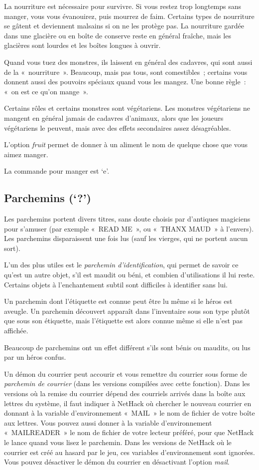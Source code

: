 \documentclass[titlepage]{article}
\begin{document}
La nourriture est nécessaire pour survivre.
Si vous restez trop longtemps sans manger, vous vous évanouirez, puis
mourrez de faim.
Certains types de nourriture se gâtent et deviennent malsains si on ne les
protège pas.
La nourriture gardée dans une glacière ou en boîte de conserve reste en
général fraîche, mais les glacières sont lourdes et les boîtes longues à
ouvrir.


Quand vous tuez des monstres, ils laissent en général des cadavres, qui
sont aussi de la «~nourriture~».
Beaucoup, mais pas tous, sont comestibles~; certains vous donnent aussi
des pouvoirs spéciaux quand vous les mangez.
Une bonne règle~: «~on est ce qu'on mange~».


Certains rôles et certains monstres sont végétariens.
Les monstres végétariens ne mangent en général jamais de cadavres
d'animaux, alors que les joueurs végétariens le peuvent, mais avec des
effets secondaires assez désagréables.


L'option
\textit{fruit}
permet de donner à un aliment le nom de quelque chose que vous aimez
manger.


La commande pour manger est `e'.

\subsection{Parchemins (`?')}



Les parchemins portent divers titres, sans doute choisis par d'antiques
magiciens pour s'amuser (par exemple «~READ ME~», ou «~THANX
MAUD~» à l'envers).
Les parchemins disparaissent une fois lus (sauf les vierges, qui ne
portent aucun sort).


L'un des plus utiles est le \textit{parchemin d'identification}, qui permet
de savoir ce qu'est un autre objet, s'il est maudit ou béni, et combien
d'utilisations il lui reste.
Certains objets à l'enchantement subtil sont difficiles à identifier sans
lui.


Un parchemin dont l'étiquette est connue peut être lu même si le héros
est aveugle.
Un parchemin découvert apparaît dans l'inventaire sous son type plutôt que
sous son étiquette, mais l'étiquette est alors connue même si elle n'est
pas affichée.


Beaucoup de parchemins ont un effet différent s'ils sont bénis ou maudits,
ou lus par un héros confus.


Un démon du courrier peut accourir et vous remettre du courrier sous forme
de \textit{parchemin de courrier} (dans les versions compilées avec cette
fonction).
Dans les versions où la remise du courrier dépend des courriels arrivés
dans la boîte aux lettres du système, il faut indiquer à NetHack où
chercher le nouveau courrier en donnant à la variable d'environnement
«~MAIL~» le nom de fichier de votre boîte aux lettres.
Vous pouvez aussi donner à la variable d'environnement «~MAILREADER~»
le nom de fichier de votre lecteur préféré, pour que NetHack le lance
quand vous lisez le parchemin.
Dans les versions de NetHack où le courrier est créé au hasard par le jeu,
ces variables d'environnement sont ignorées.
Vous pouvez désactiver le démon du courrier en désactivant l'option
\textit{mail}.
\end{document}
